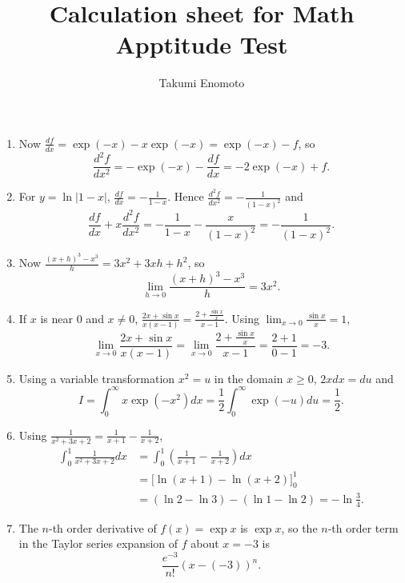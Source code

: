 \documentclass{article}
\title{Calculation sheet for Math Apptitude Test}
\date{}
\author{Takumi Enomoto}
\begin{document}
\maketitle

\begin{enumerate}

  \item
    Now $\frac{df}{dx} = \exp(-x) - x \exp(-x) = \exp(-x) - f$,
    so
    $$
      \frac{d^2f}{dx^2} = -\exp(-x) - \frac{df}{dx} = -2 \exp(-x) + f.
    $$

  \item 
    For $y = \ln|1-x|$, $\frac{df}{dx} = -\frac{1}{1-x}$.
    Hence $\frac{d^2f}{dx^2} = -\frac{1}{(1-x)^2}$ and
    $$
    \frac{df}{dx} + x \frac{d^2f}{dx^2} = -\frac{1}{1-x} - \frac{x}{(1-x)^2} = - \frac{1}{(1-x)^2}.
    $$

  \item 
    Now $\frac{(x+h)^3 - x^3}{h} = 3 x^2 + 3xh + h^2$, so
    $$
      \lim_{h \to 0} \frac{(x+h)^3 - x^3}{h} = 3 x^2.
    $$

  \item 
    If $x$ is near $0$ and $x \neq 0$, $\frac{2x + \sin x}{x(x-1)} = \frac{2 + \frac{\sin x}{x}}{x-1}$.
    Using $\lim_{x \to 0} \frac{\sin x}{x}  = 1$,
    $$
      \lim_{x \to 0} \frac{2x + \sin x}{x(x-1)} = \lim_{x \to 0} \frac{2 + \frac{\sin x}{x}}{x-1} = \frac{2 + 1}{0 - 1} = -3.
    $$

  \item
    Using a variable transformation $x^2 = u$ in the domain $x \geq 0$,
    $2x dx = du$ and  
    $$
      I = \int_{0}^{\infty} x \exp(-x^2) dx
        = \frac{1}{2} \int_{0}^{\infty} \exp(-u) du = \frac{1}{2}.
    $$

  \item 
    Using $\frac{1}{x^2 + 3x + 2} = \frac{1}{x+1} - \frac{1}{x+2}$,
    \begin{align*}
      \int_{0}^{1} \frac{1}{x^2 + 3x + 2} dx &= \int_{0}^{1} \left( \frac{1}{x+1} - \frac{1}{x+2} \right) dx \\
       &= \bigg[ \ln (x+1) - \ln(x+2) \bigg]_{0}^{1} \\
       &= ( \ln 2 - \ln 3 ) - ( \ln 1 - \ln 2) = - \ln \frac{3}{4}.
    \end{align*}

  \item 
    The $n$-th order derivative of $f(x) = \exp x$ is $\exp x$, so the $n$-th order term
    in the Taylor series expansion of $f$  about $x=-3$ is
    $$
        \frac{e^{-3}}{n!} (x - (-3))^n.
    $$


\end{enumerate}
\end{document}
